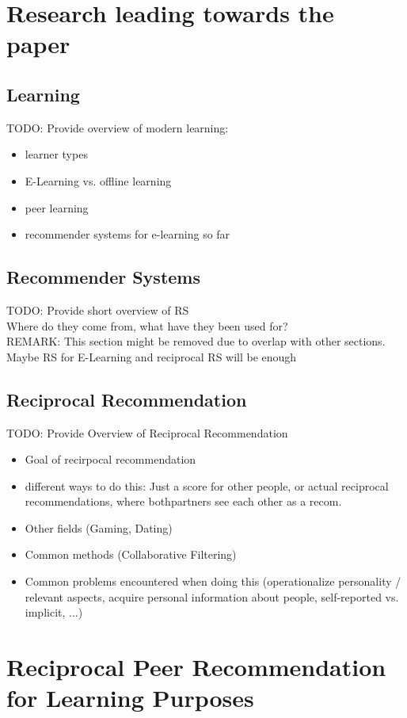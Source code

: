 \documentclass[nochapterpage,bigchapter,linedtoc,longdoc,colorback,accentcolor=tud3b]{tudreport}
\begin{document}
\chapter{Research leading towards the paper}
\section{Learning}
TODO: Provide overview of modern learning:\\
\begin{itemize}
	\item learner types
	\item E-Learning vs. offline learning
	\item peer learning
	\item recommender systems for e-learning so far
\end{itemize}

\section{Recommender Systems}
TODO: Provide short overview of RS\\
Where do they come from, what have they been used for?\\
REMARK: This section might be removed due to overlap with other sections. Maybe RS for E-Learning and reciprocal RS will be enough\\

\section{Reciprocal Recommendation}
TODO: Provide Overview of Reciprocal Recommendation\\
\begin{itemize}
	\item Goal of recirpocal recommendation
	\item different ways to do this: Just a score for other people, or actual reciprocal recommendations, where bothpartners see each other as a recom.
	\item Other fields (Gaming, Dating)
	\item Common methods (Collaborative Filtering)
	\item Common problems encountered when doing this (operationalize personality / relevant aspects, acquire personal information about people, self-reported vs. implicit, ...)
\end{itemize}

\chapter{Reciprocal Peer Recommendation for Learning Purposes}
\end{document}
